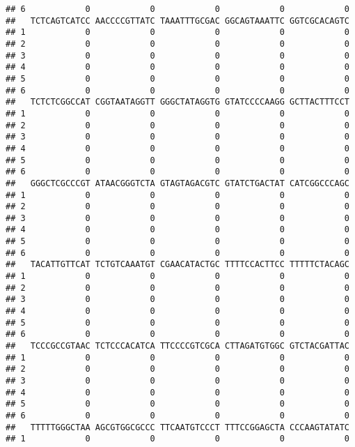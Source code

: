 \documentclass[]{article}
\begin{document}
\begin{verbatim}
## 6            0            0            0            0            0
##   TCTCAGTCATCC AACCCCGTTATC TAAATTTGCGAC GGCAGTAAATTC GGTCGCACAGTC
## 1            0            0            0            0            0
## 2            0            0            0            0            0
## 3            0            0            0            0            0
## 4            0            0            0            0            0
## 5            0            0            0            0            0
## 6            0            0            0            0            0
##   TCTCTCGGCCAT CGGTAATAGGTT GGGCTATAGGTG GTATCCCCAAGG GCTTACTTTCCT
## 1            0            0            0            0            0
## 2            0            0            0            0            0
## 3            0            0            0            0            0
## 4            0            0            0            0            0
## 5            0            0            0            0            0
## 6            0            0            0            0            0
##   GGGCTCGCCCGT ATAACGGGTCTA GTAGTAGACGTC GTATCTGACTAT CATCGGCCCAGC
## 1            0            0            0            0            0
## 2            0            0            0            0            0
## 3            0            0            0            0            0
## 4            0            0            0            0            0
## 5            0            0            0            0            0
## 6            0            0            0            0            0
##   TACATTGTTCAT TCTGTCAAATGT CGAACATACTGC TTTTCCACTTCC TTTTTCTACAGC
## 1            0            0            0            0            0
## 2            0            0            0            0            0
## 3            0            0            0            0            0
## 4            0            0            0            0            0
## 5            0            0            0            0            0
## 6            0            0            0            0            0
##   TCCCGCCGTAAC TCTCCCACATCA TTCCCCGTCGCA CTTAGATGTGGC GTCTACGATTAC
## 1            0            0            0            0            0
## 2            0            0            0            0            0
## 3            0            0            0            0            0
## 4            0            0            0            0            0
## 5            0            0            0            0            0
## 6            0            0            0            0            0
##   TTTTTGGGCTAA AGCGTGGCGCCC TTCAATGTCCCT TTTCCGGAGCTA CCCAAGTATATC
## 1            0            0            0            0            0

\end{verbatim}
\end{document}
